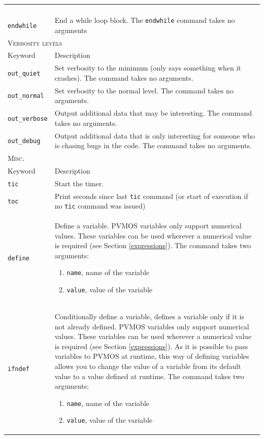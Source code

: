 \documentclass[noshowpacs,preprintnumbers,amsmath,amssymb, letter]{revtex4}
\begin{document}
\begin{longtable}{p{}p{}}
\begin{enumerate}
\end{enumerate}\\
\texttt{endwhile}	&  End a while loop block. The \texttt{endwhile} command takes no arguments\\
\multicolumn{2}{l}{\textsc{Verbosity levels}} \\*
\hline
Keyword & Description \\
\texttt{out\_quiet}	&  Set verbosity to the minimum (only says something when it crashes). The command takes no arguments.\\
\texttt{out\_normal}	&  Set verbosity to the normal level. The command takes no arguments.\\
\texttt{out\_verbose}	&  Output additional data that may be interesting. The command takes no arguments.\\
\texttt{out\_debug}	&  Output additional data that is only interesting for someone who is chasing bugs in the code. The command takes no arguments.\\
\multicolumn{2}{l}{\textsc{Misc.}} \\*
\hline
Keyword & Description \\
\texttt{tic}	&  Start the timer.\\
\texttt{toc}	&  Print seconds since last \texttt{tic} command (or start of execution if no \texttt{tic} command was issued)\\
\texttt{define}	&  Define a variable. PVMOS variables only support numerical values. These variables can be used wherever a numerical value is required (see Section \ref{expressions}). The command takes two arguments:
\begin{enumerate}
\item \texttt{name}, name of the variable
\item \texttt{value}, value of the variable
\end{enumerate}\\
\texttt{ifndef}	&  Conditionally define a variable, defines a variable only if it is not already defined. PVMOS variables only support numerical values. These variables can be used wherever a numerical value is required (see Section \ref{expressions}). As it is possible to pass variables to PVMOS at runtime, this way of defining variables allows you to change the value of a variable from its default value to a value defined at runtime. The command takes two arguments:
\begin{enumerate}
\item \texttt{name}, name of the variable
\item \texttt{value}, value of the variable

\end{enumerate}
\end{longtable}
\end{document}
